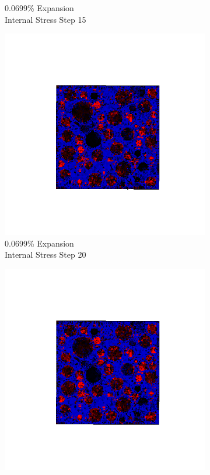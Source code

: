 \begin{figure}[h!]
\begin{subfigure}{.25\textwidth}
      \caption{0.0699\% Expansion\\Internal Stress Step 15}
    \end{subfigure}%
    \begin{subfigure}{.25\textwidth}
      \centering
      \includegraphics[width=1.0\linewidth]{Files/exp_3D/ASR/A30P75_1_stress.png}
      \caption{0.0699\% Expansion\\Internal Stress Step 20}
    \end{subfigure}
    \begin{subfigure}{.25\textwidth}
      \centering
      \includegraphics[width=1.0\linewidth]{Files/exp_3D/ASR/A30P75_2_s5.png}

\end{subfigure}
\end{figure}
